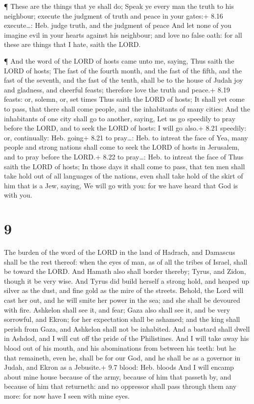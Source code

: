  ¶ These are the things that ye shall do; Speak ye every
man the truth to his neighbour; execute the judgment of truth and peace
in your gates:+ 8.16 execute\ldots: Heb. judge truth, and the judgment
of peace  And let none of you imagine evil in your hearts
against his neighbour; and love no false oath: for all these are things
that I hate, saith the LORD.

 ¶ And the word of the LORD of hosts came unto me, saying,
 Thus saith the LORD of hosts; The fast of the fourth
month, and the fast of the fifth, and the fast of the seventh, and the
fast of the tenth, shall be to the house of Judah joy and gladness, and
cheerful feasts; therefore love the truth and peace.+ 8.19 feasts: or,
solemn, or, set times  Thus saith the LORD of hosts; It
shall yet come to pass, that there shall come people, and the
inhabitants of many cities:  And the inhabitants of one
city shall go to another, saying, Let us go speedily to pray before the
LORD, and to seek the LORD of hosts: I will go also.+ 8.21 speedily: or,
continually: Heb. going+ 8.21 to pray\ldots: Heb. to intreat the face of
 Yea, many people and strong nations shall come to seek the
LORD of hosts in Jerusalem, and to pray before the LORD.+ 8.22 to
pray\ldots: Heb. to intreat the face of  Thus saith the
LORD of hosts; In those days it shall come to pass, that ten men shall
take hold out of all languages of the nations, even shall take hold of
the skirt of him that is a Jew, saying, We will go with you: for we have
heard that God is with you.

\hypertarget{section-8}{%
\section{9}\label{section-8}}

 The burden of the word of the LORD in the land of Hadrach,
and Damascus shall be the rest thereof: when the eyes of man, as of all
the tribes of Israel, shall be toward the LORD.  And Hamath
also shall border thereby; Tyrus, and Zidon, though it be very wise.
 And Tyrus did build herself a strong hold, and heaped up
silver as the dust, and fine gold as the mire of the streets.
 Behold, the Lord will cast her out, and he will smite her
power in the sea; and she shall be devoured with fire. 
Ashkelon shall see it, and fear; Gaza also shall see it, and be very
sorrowful, and Ekron; for her expectation shall be ashamed; and the king
shall perish from Gaza, and Ashkelon shall not be inhabited.
 And a bastard shall dwell in Ashdod, and I will cut off the
pride of the Philistines.  And I will take away his blood
out of his mouth, and his abominations from between his teeth: but he
that remaineth, even he, shall be for our God, and he shall be as a
governor in Judah, and Ekron as a Jebusite.+ 9.7 blood: Heb. bloods
 And I will encamp about mine house because of the army,
because of him that passeth by, and because of him that returneth: and
no oppressor shall pass through them any more: for now have I seen with
mine eyes.

